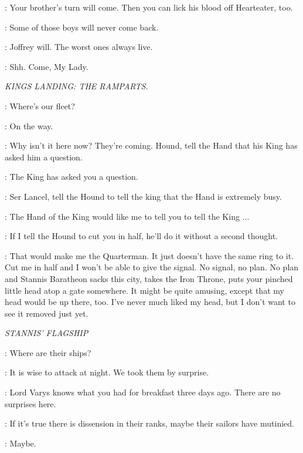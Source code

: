 \JOFFREY: Your brother's turn will come. Then you can lick his blood off Hearteater, too. 


\SHAE: Some of those boys will never come back. 

\SANSA: Joffrey will. The worst ones always live. 

\SHAE: Shh. Come, My Lady. 


\scene

\textit{KINGS LANDING: THE RAMPARTS.}


\LANCEL: Where's our fleet? 

\TYRION: On the way. 

\JOFFREY: Why isn't it here now? They're coming. Hound, tell the Hand that his King has asked him a question. 

\HOUND: The King has asked you a question. 

\TYRION: Ser Lancel, tell the Hound to tell the king that the Hand is extremely busy. 

\LANCEL: The Hand of the King would like me to tell you to tell the King $\ldots$  

\JOFFREY: If I tell the Hound to cut you in half, he'll do it without a second thought. 

\TYRION: That would make me the Quarterman. It just doesn't have the same ring to it. Cut me in half and I won't be able to give the signal. No signal, no plan. No plan and Stannis Baratheon sacks this city, takes the Iron Throne, puts your pinched little head atop a gate somewhere. It might be quite amusing, except that my head would be up there, too. I've never much liked my head, but I don't want to see it removed just yet. 


\scene

\textit{STANNIS' FLAGSHIP}


\DAVOS: Where are their ships? 

\MATTHOS: It is wise to attack at night. We took them by surprise. 

\DAVOS: Lord Varys knows what you had for breakfast three days ago.  There are no surprises here. 

\MATTHOS: If it's true there is dissension in their ranks, maybe their sailors have mutinied. 

\DAVOS: Maybe. 


